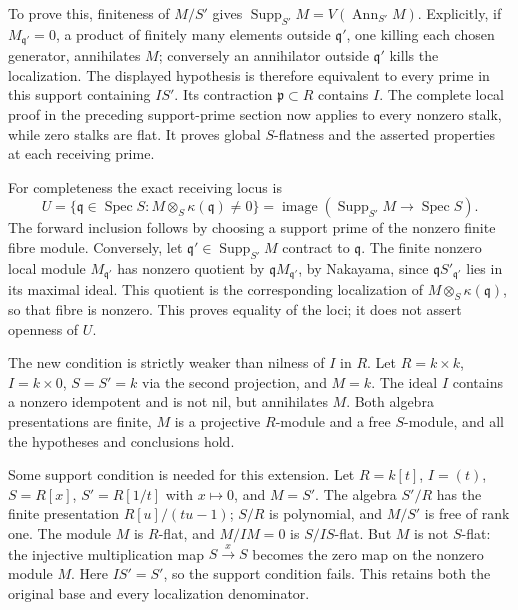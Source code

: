 To prove this, finiteness of \(M/S'\) gives \(\operatorname{Supp}_{S'}M=V(\operatorname{Ann}_{S'}M)\). Explicitly, if \(M_{\mathfrak q'}=0\), a product of finitely many elements outside \(\mathfrak q'\), one killing each chosen generator, annihilates \(M\); conversely an annihilator outside \(\mathfrak q'\) kills the localization. The displayed hypothesis is therefore equivalent to every prime in this support containing \(IS'\). Its contraction \(\mathfrak p\subset R\) contains \(I\). The complete local proof in the preceding support-prime section now applies to every nonzero stalk, while zero stalks are flat. It proves global \(S\)-flatness and the asserted properties at each receiving prime.

For completeness the exact receiving locus is \[
U=\{\mathfrak q\in\operatorname{Spec}S:
M\otimes_S\kappa(\mathfrak q)\ne0\}
=\operatorname{image}(\operatorname{Supp}_{S'}M\longrightarrow\operatorname{Spec}S).
\] The forward inclusion follows by choosing a support prime of the nonzero finite fibre module. Conversely, let \(\mathfrak q'\in\operatorname{Supp}_{S'}M\) contract to \(\mathfrak q\). The finite nonzero local module \(M_{\mathfrak q'}\) has nonzero quotient by \(\mathfrak qM_{\mathfrak q'}\), by Nakayama, since \(\mathfrak qS'_{\mathfrak q'}\) lies in its maximal ideal. This quotient is the corresponding localization of \(M\otimes_S\kappa(\mathfrak q)\), so that fibre is nonzero. This proves equality of the loci; it does not assert openness of \(U\).

The new condition is strictly weaker than nilness of \(I\) in \(R\). Let \(R=k\times k\), \(I=k\times0\), \(S=S'=k\) via the second projection, and \(M=k\). The ideal \(I\) contains a nonzero idempotent and is not nil, but annihilates \(M\). Both algebra presentations are finite, \(M\) is a projective \(R\)-module and a free \(S\)-module, and all the hypotheses and conclusions hold.

Some support condition is needed for this extension. Let \(R=k[t]\), \(I=(t)\), \(S=R[x]\), \(S'=R[1/t]\) with \(x\mapsto0\), and \(M=S'\). The algebra \(S'/R\) has the finite presentation \(R[u]/(tu-1)\); \(S/R\) is polynomial, and \(M/S'\) is free of rank one. The module \(M\) is \(R\)-flat, and \(M/IM=0\) is \(S/IS\)-flat. But \(M\) is not \(S\)-flat: the injective multiplication map \(S\xrightarrow{x}S\) becomes the zero map on the nonzero module \(M\). Here \(IS'=S'\), so the support condition fails. This retains both the original base and every localization denominator.

